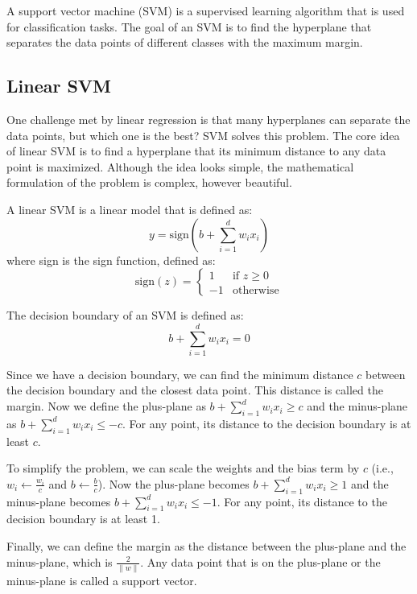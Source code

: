 \documentclass[a4paper,12pt]{article}
\begin{document}
A support vector machine (SVM) is a supervised learning algorithm that is used for classification tasks. The goal of an SVM is to find the hyperplane that separates the data points of different classes with the maximum margin.

\subsection{Linear SVM}

One challenge met by linear regression is that many hyperplanes can separate the data points, but which one is the best? SVM solves this problem. The core idea of linear SVM is to find a hyperplane that its minimum distance to any data point is maximized. Although the idea looks simple, the mathematical formulation of the problem is complex, however beautiful.

A linear SVM is a linear model that is defined as:
\begin{equation*}
  y = \text{sign}\left(b + \sum_{i=1}^{d} w_i x_i\right)
\end{equation*}
where sign is the sign function, defined as:
\begin{equation*}
  \text{sign}(z) = \begin{cases}
    1 & \text{if } z \geq 0 \\
    -1 & \text{otherwise}
  \end{cases}
\end{equation*}

The decision boundary of an SVM is defined as:
\begin{equation*}
  b + \sum_{i=1}^{d} w_i x_i = 0
\end{equation*}

Since we have a decision boundary, we can find the minimum distance $c$ between the decision boundary and the closest data point. This distance is called the margin. Now we define the plus-plane as $b + \sum_{i=1}^{d} w_i x_i \geq c$ and the minus-plane as $b + \sum_{i=1}^{d} w_i x_i \leq -c$. For any point, its distance to the decision boundary is at least $c$.

To simplify the problem, we can scale the weights and the bias term by $c$ (i.e., $w_i \gets \frac{w_i}{c}$ and $b \gets \frac{b}{c}$). Now the plus-plane becomes $b + \sum_{i=1}^{d} w_i x_i \geq 1$ and the minus-plane becomes $b + \sum_{i=1}^{d} w_i x_i \leq -1$. For any point, its distance to the decision boundary is at least 1.

Finally, we can define the margin as the distance between the plus-plane and the minus-plane, which is $\frac{2}{\|w\|}$. Any data point that is on the plus-plane or the minus-plane is called a support vector.
\end{document}

